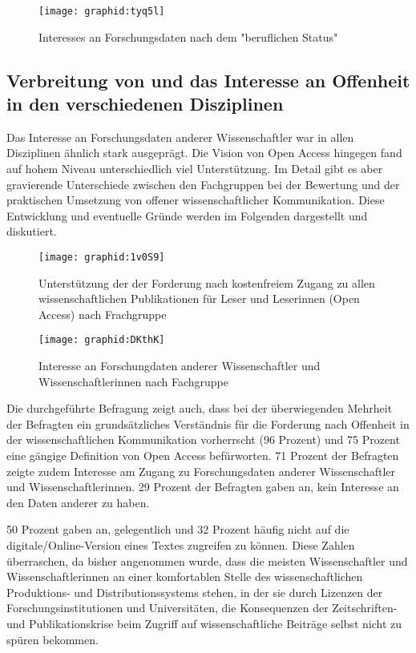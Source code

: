 \begin{figure}[h!]
\texttt{[image: graphid:tyq5l]}
\caption{Interesses an Forschungsdaten nach dem "beruflichen Status"}
\end{figure}

\subsection{Verbreitung von und das Interesse an Offenheit in den verschiedenen Disziplinen}

Das Interesse an Forschungsdaten anderer Wissenschaftler war in allen Disziplinen ähnlich stark ausgeprägt. Die Vision von Open Access hingegen fand auf hohem Niveau unterschiedlich viel Unterstützung. Im Detail gibt es aber gravierende Unterschiede zwischen den Fachgruppen bei der Bewertung und der praktischen Umsetzung von offener wissenschaftlicher Kommunikation. Diese Entwicklung und eventuelle Gründe werden im Folgenden dargestellt und diskutiert.

\begin{figure}[h!]
\texttt{[image: graphid:1v0S9]}
\caption{Unterstützung der der Forderung nach kostenfreiem Zugang zu allen wissenschaftlichen Publikationen für Leser und Leserinnen (Open Access) nach Frachgruppe}
\end{figure}

\begin{figure}[h!]
\texttt{[image: graphid:DKthK]}
\caption{Interesse an Forschungdaten anderer Wissenschaftler und Wissenschaftlerinnen nach Fachgruppe}
\end{figure}

Die durchgeführte Befragung zeigt auch, dass bei der überwiegenden Mehrheit der Befragten ein grundsätzliches Verständnis für die Forderung nach Offenheit in der wissenschaftlichen Kommunikation vorherrscht (96 Prozent) und 75 Prozent eine gängige Definition von Open Access befürworten. 71 Prozent der Befragten zeigte zudem Interesse am Zugang zu Forschungsdaten anderer Wissenschaftler und Wissenschaftlerinnen. 29 Prozent der Befragten gaben an, kein Interesse an den Daten anderer zu haben.

50 Prozent gaben an, gelegentlich und 32 Prozent häufig nicht auf die digitale/Online-Version eines Textes zugreifen zu können. Diese Zahlen überraschen, da bisher angenommen wurde, dass die meisten Wissenschaftler und Wissenschaftlerinnen an einer komfortablen Stelle des wissenschaftlichen Produktions- und Distributionssystems \cite{herb_2010} stehen, in der sie durch Lizenzen der Forschungsinstitutionen und Universitäten, die Konsequenzen der Zeitschriften- und Publikationskrise beim Zugriff auf wissenschaftliche Beiträge selbst nicht zu spüren bekommen.

